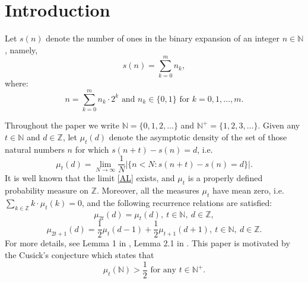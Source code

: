 \documentclass[10pt]{amsart}
\theoremstyle{definition}
\numberwithin{equation}{section}
\newcommand{\N}{\mathbb{N}}
\newcommand{\Z}{\mathbb{Z}}
\begin{document}
\maketitle

\section{Introduction}
Let $s(n)$ denote the number of ones in the binary expansion of an integer $n\in\N$, namely,
\[\textstyle s(n)=\sum_{k=0}^{m}n_k,\]
where: \begin{equation}\textstyle n=\sum_{k=0}^{m}n_k\cdot 2^k\mbox{ and } n_k\in\{0,1\}\mbox{ for }k=0,1,\dots,m. \end{equation}


 Throughout the paper we write $\N=\{0,1,2,\dots\}$ and $\N^+=\{1,2,3,\dots\}$. Given any $t\in\mathbb{N}$ and $d\in\mathbb{Z}$, let $\mu_t(d)$ denote the asymptotic density of the set of those natural numbers $n$ for which $s(n+t)-s(n)=d$, i.e.
\begin{equation}\label{AL}
\mu_t(d)=\lim_{N\to\infty} \frac{1}{N}|\{ n< N \colon s(n+t) -s(n)=d \} |.
\end{equation}
It is well known that the limit \eqref{AL} exists, and $\mu_t$ is a properly defined probability measure on $\mathbb{Z}$. Moreover, all the measures $\mu_t$ have mean zero, i.e. $\sum\limits_{k\in\mathbb{Z}}k\cdot\mu_t(k)=0$, and the following recurrence relations are satisfied:
\begin{equation}\label{even}
\mu_{2t}(d)=\mu_t(d),\ t\in\N,\ d\in\Z,
\end{equation}
\begin{equation}\label{odd}
\mu_{2t+1}(d)=\frac{1}{2}\mu_t(d-1)+\frac{1}{2}\mu_{t+1}(d+1),\ t\in\N,\ d\in\Z.
\end{equation}
For more details, see Lemma 1 in \cite{besineau}, Lemma 2.1 in \cite{drmota}. This paper is motivated by the Cusick's conjecture which states that
\begin{equation}\label{Cc}
{\textstyle{\mu_t(\N)>\frac12\mbox{ for any }t\in\N^+.}}
\end{equation}
\end{document}
